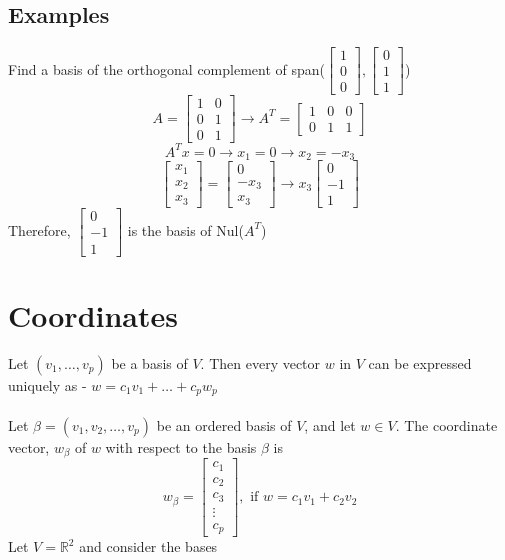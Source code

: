 \begin{enumerate}
\subsection{Examples}
Find a basis of the orthogonal complement of span($\begin{bmatrix} 1 \\ 0 \\ 0 \end{bmatrix}, 
\begin{bmatrix} 0 \\ 1 \\ 1 \end{bmatrix}$)
\[
  A = \begin{bmatrix} 1 & 0 \\ 0 & 1 \\ 0 & 1 \end{bmatrix} \rightarrow A^T = \begin{bmatrix}
  1 & 0 & 0 \\ 0 & 1 & 1 \end{bmatrix}
\]
\[
  A^Tx = 0 \rightarrow x_1 = 0 \rightarrow x_2 = -x_3
\]
\[
  \begin{bmatrix} x_1 \\ x_2 \\ x_3 \end{bmatrix} = \begin{bmatrix} 0 \\ -x_3 \\ x_3 \end{bmatrix} 
  \rightarrow x_3 \begin{bmatrix} 0 \\ -1 \\ 1 \end{bmatrix}
\] Therefore,
$\begin{bmatrix} 0 \\ -1 \\ 1 \end{bmatrix}$ is the basis of Nul($A^T$)
\section{Coordinates}
Let $(v_1, \dots, v_p)$ be a basis of $V$. Then every vector $w$ in $V$ can be expressed uniquely as 
- $w = c_1v_1 + \dots + c_pw_p$ \\\\
Let $\beta = (v_1, v_2, \dots, v_p)$ be an ordered basis of $V$, and let $w \in V$. The coordinate 
vector, $w_\beta$ of $w$ with respect to the basis $\beta$ is 
\[
  w_\beta = \begin{bmatrix} c_1 \\ c_2 \\ c_3 \\ \vdots \\ c_p \end{bmatrix}, \text{ if }
  w = c_1v_1 + c_2v_2
\]
Let $V = \mathbb{R}^2$ and consider the bases

\end{enumerate}
